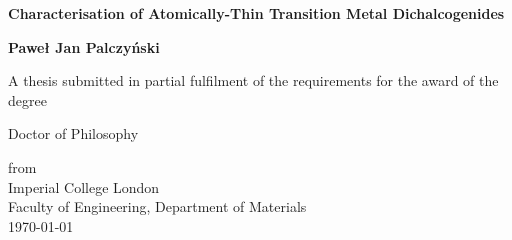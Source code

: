 \begin{titlepage}
	\begin{center}
		\begin{Large}
		\vspace*{1cm}
		
		\textbf{Characterisation of Atomically-Thin Transition Metal Dichalcogenides}
		\vspace{0.5cm}
		\end{Large}
		
		\textbf{Paweł Jan Palczyński}
		\vspace{0.5cm}
		
		\small{A thesis submitted in partial fulfilment of the requirements for the award of the degree}\\
		\vspace{0.5cm}
		\begin{normalsize}
		Doctor of Philosophy\\
		\end{normalsize}
		\vspace{0.5cm}
		from\\
		\vspace{0.5cm}
		Imperial College London\\
		\vfill
		Faculty of Engineering, Department of Materials\\
		\today
	\end{center}
\end{titlepage}